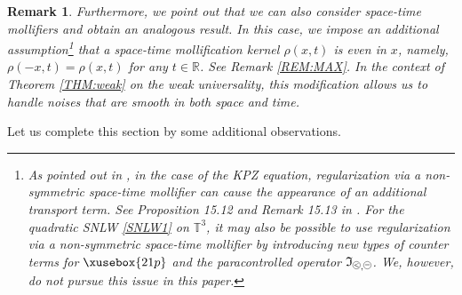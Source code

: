 \documentclass[%
11pt,  reqno]{amsart}
\def\<#1>{\xusebox{#1}}
\newcommand{\pe}{\mathbin{\scaleobj{0.7}{\tikz \draw (0,0) node[shape=circle,draw,inner sep=0pt,minimum size=8.5pt] {\scriptsize  $=$};}}}
\newcommand{\pl}{\mathbin{\scaleobj{0.7}{\tikz \draw (0,0) node[shape=circle,draw,inner sep=0pt,minimum size=8.5pt] {\scriptsize $<$};}}}
\newtheorem{remark}[theorem]{Remark}
\newcommand{\1}{\hspace{0.2mm}\text{I}\hspace{0.2mm}}
\newcommand{\R}{\mathbb{R}}
\newcommand{\T}{\mathbb{T}}
\newcommand{\If}{\mathfrak{I}}
\numberwithin{equation}{section}
\numberwithin{theorem}{section}
\begin{document}
\begin{remark}
Furthermore, we point out that we can also consider
space-time mollifiers and obtain an analogous result.
In this case,  we impose an additional assumption\footnote
{As pointed out in \cite{Hairer0, Hairer}, 
in the case of the KPZ equation, 
 regularization via a non-symmetric space-time mollifier can cause the appearance 
  of an additional transport term. %
    See Proposition 15.12 and Remark 15.13 in 
  \cite{friz_course_2014}.
For the quadratic SNLW  \eqref{SNLW1} on $\T^3$, 
it may also be possible to use 
 regularization via a non-symmetric space-time mollifier 
by introducing new types of counter terms
for $\<21p>$ and the paracontrolled operator
$\If_{\pl, \pe}$.
We, however,  do not pursue this issue in this paper.}
that a space-time mollification kernel $\rho(x, t)$ is even in $x$, 
namely, $\rho(-x, t) = \rho(x, t)$ for any $t \in \R$.
See Remark \ref{REM:MAX}.
In the context of  
Theorem \ref{THM:weak} on the weak universality, 
this modification allows us to handle 
 noises that are smooth in both space and time.
\end{remark}




Let us complete this section by some additional observations.
\end{document}
